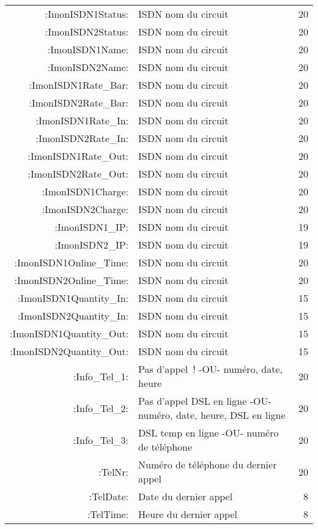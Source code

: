 \begin{description}
\begin{small}
\begin{center}
\begin{longtable}{rp{7cm}r}
       :ImonISDN1Status: &       ISDN nom du circuit        &  20 \\
       :ImonISDN2Status: &       ISDN nom du circuit        &  20 \\
         :ImonISDN1Name: &       ISDN nom du circuit        &  20 \\
         :ImonISDN2Name: &       ISDN nom du circuit        &  20 \\
    :ImonISDN1Rate\_Bar: &       ISDN nom du circuit        &  20 \\
    :ImonISDN2Rate\_Bar: &       ISDN nom du circuit        &  20 \\
     :ImonISDN1Rate\_In: &       ISDN nom du circuit        &  20 \\
     :ImonISDN2Rate\_In: &       ISDN nom du circuit        &  20 \\
    :ImonISDN1Rate\_Out: &       ISDN nom du circuit        &  20 \\
    :ImonISDN2Rate\_Out: &       ISDN nom du circuit        &  20 \\
       :ImonISDN1Charge: &       ISDN nom du circuit        &  20 \\
       :ImonISDN2Charge: &       ISDN nom du circuit        &  20 \\
         :ImonISDN1\_IP: &       ISDN nom du circuit        &  19 \\
         :ImonISDN2\_IP: &       ISDN nom du circuit        &  19 \\
 :ImonISDN1Online\_Time: &       ISDN nom du circuit        &  20 \\
 :ImonISDN2Online\_Time: &       ISDN nom du circuit        &  20 \\
 :ImonISDN1Quantity\_In: &       ISDN nom du circuit        &  15 \\
 :ImonISDN2Quantity\_In: &       ISDN nom du circuit        &  15 \\
:ImonISDN1Quantity\_Out: &       ISDN nom du circuit        &  15 \\
:ImonISDN2Quantity\_Out: &       ISDN nom du circuit        &  15 \\

          :Info\_Tel\_1: &       Pas d'appel~! -OU- numéro, date, heure &  20 \\
          :Info\_Tel\_2: &       Pas d'appel DSL en ligne -OU- numéro, date, heure, DSL en ligne &  20 \\
          :Info\_Tel\_3: &       DSL temp en ligne -OU- numéro de téléphone &  20 \\
                 :TelNr: &       Numéro de téléphone du dernier appel &  20 \\
               :TelDate: &       Date du dernier appel      &   8 \\
               :TelTime: &       Heure du dernier appel     &   8 \\
       

\end{longtable}
\end{center}
\end{small}
\end{description}
